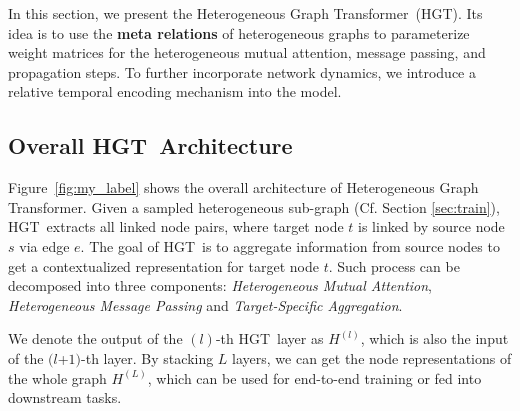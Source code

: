 \documentclass[sigconf]{acmart}
\theoremstyle{definition}
\newcommand{\model}{Heterogeneous Graph Transformer}
\newcommand{\short}{HGT}
\begin{document}
In this section, we present the \model\ (\short). Its  idea is to use the \textbf{meta relations} of heterogeneous graphs to parameterize weight matrices for the heterogeneous mutual attention, message passing, and propagation steps. 
To further incorporate network dynamics, we introduce a relative temporal encoding mechanism into the model.




\subsection{Overall \short\ Architecture}

Figure~\ref{fig:my_label} shows the overall architecture of \model. Given a sampled heterogeneous sub-graph (Cf. Section \ref{sec:train}), \short\ extracts all linked node pairs, where target node $t$ is linked by source node $s$ via edge $e$. The goal of \short\ is to aggregate information from source nodes to get a contextualized representation for target node $t$. Such process can be decomposed into three components: \textit{Heterogeneous Mutual Attention}, \textit{Heterogeneous Message Passing} and \textit{Target-Specific Aggregation}. 

We denote the output of the $(l)$-th \short\ layer as $H^{(l)}$, which is also the input of the $(l$+$1)$-th layer. 
By stacking $L$ layers, we can get the node representations of the whole graph $H^{(L)}$, which can be used for end-to-end training or fed into downstream tasks.  
\end{document}
